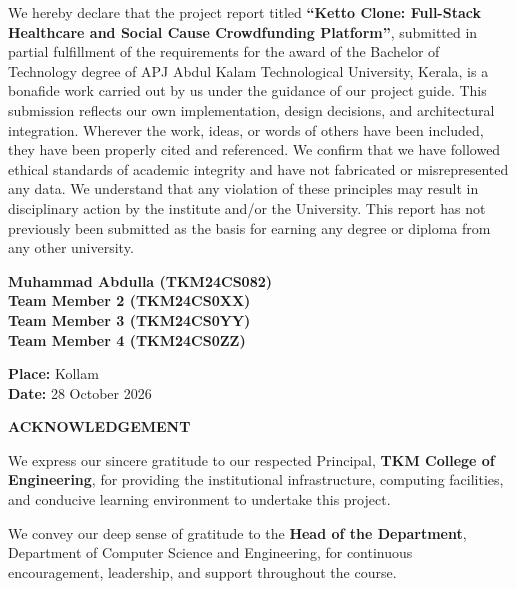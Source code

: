 \documentclass[12pt,a4paper,oneside]{report}
\begin{document}
We hereby declare that the project report titled \textbf{``Ketto Clone: Full-Stack Healthcare and Social Cause Crowdfunding Platform''}, submitted in partial fulfillment of the requirements for the award of the Bachelor of Technology degree of APJ Abdul Kalam Technological University, Kerala, is a bonafide work carried out by us under the guidance of our project guide. This submission reflects our own implementation, design decisions, and architectural integration. Wherever the work, ideas, or words of others have been included, they have been properly cited and referenced. We confirm that we have followed ethical standards of academic integrity and have not fabricated or misrepresented any data. We understand that any violation of these principles may result in disciplinary action by the institute and/or the University. This report has not previously been submitted as the basis for earning any degree or diploma from any other university.

\vspace{1.2cm}
\noindent
\begin{minipage}[t]{0.55\textwidth}
\textbf{Muhammad Abdulla (TKM24CS082)}\\
\textbf{Team Member 2 (TKM24CS0XX)}\\
\textbf{Team Member 3 (TKM24CS0YY)}\\
\textbf{Team Member 4 (TKM24CS0ZZ)}
\end{minipage}
\hfill
\begin{minipage}[t]{0.4\textwidth}
\raggedleft
\textbf{Place:} Kollam\\[0.3cm]
\textbf{Date:} 28 October 2026
\end{minipage}

\clearpage
\thispagestyle{plain}
\begin{center}
\vspace*{0.3cm}
{\Large\bfseries ACKNOWLEDGEMENT\par}
\vspace{0.8cm}
\end{center}

We express our sincere gratitude to our respected Principal, \textbf{TKM College of Engineering}, for providing the institutional infrastructure, computing facilities, and conducive learning environment to undertake this project.

We convey our deep sense of gratitude to the \textbf{Head of the Department}, Department of Computer Science and Engineering, for continuous encouragement, leadership, and support throughout the course.
\end{document}
